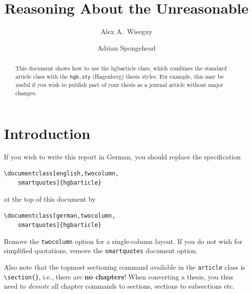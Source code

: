 \documentclass[english,twocolumn,smartquotes]{hgbarticle}
\begin{document}

\author{
	Alex A.\ Wiseguy\\ 
	\and
	Adrian Spongehead\\
}
\title{Reasoning About the Unreasonable}
\date{}

\maketitle

\begin{abstract}\noindent
This document shows how to use the \textsf{hgbarticle} class, which combines
the standard \latex \textsf{article} class with the \texttt{hgb.sty}
(Hagenberg) thesis styles. For example, this may be useful if you wish to
publish part of your thesis as a journal article without major changes.
\end{abstract}


\section{Introduction}

If you wish to write this report in German, you should replace the specification
%
\begin{verbatim}
\documentclass[english,twocolumn,
    smartquotes]{hgbarticle}
\end{verbatim}
%
at the top of this document by
%
\begin{verbatim}
\documentclass[german,twocolumn,
    smartquotes]{hgbarticle}
\end{verbatim}
%
Remove the \texttt{twocolumn} option for a single-column layout. If you do not
wish for simplified quotations, remove the \texttt{smartquotes} document option.

Also note that the topmost sectioning command available in the \texttt{article}
class is \verb!\section{}!, i.e., there are \textbf{no chapters}!
When converting a thesis, you thus need to \emph{demote} all chapter commands to
sections, sections to subsections etc.
\end{document}
